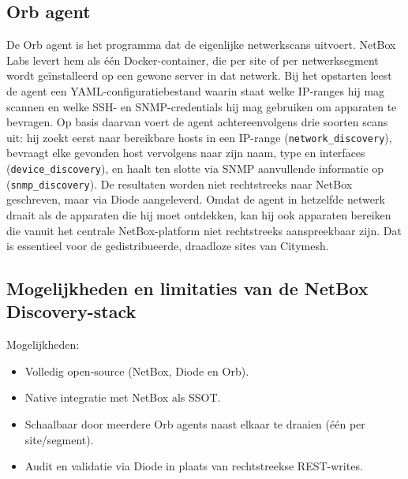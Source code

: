 \subsection{Orb agent}

De Orb agent is het programma dat de eigenlijke netwerkscans uitvoert\autocite{NetBoxLabsOrbAgent}. NetBox Labs levert hem als één Docker-container, die per site of per netwerksegment wordt geïnstalleerd op een gewone server in dat netwerk. Bij het opstarten leest de agent een YAML-configuratiebestand waarin staat welke IP-ranges hij mag scannen en welke SSH- en SNMP-credentials hij mag gebruiken om apparaten te bevragen. Op basis daarvan voert de agent achtereenvolgens drie soorten scans uit: hij zoekt eerst naar bereikbare hosts in een IP-range (\texttt{network\_discovery}), bevraagt elke gevonden host vervolgens naar zijn naam, type en interfaces (\texttt{device\_discovery}), en haalt ten slotte via SNMP aanvullende informatie op (\texttt{snmp\_discovery}). De resultaten worden niet rechtstreeks naar NetBox geschreven, maar via Diode aangeleverd. Omdat de agent in hetzelfde netwerk draait als de apparaten die hij moet ontdekken, kan hij ook apparaten bereiken die vanuit het centrale NetBox-platform niet rechtstreeks aanspreekbaar zijn. Dat is essentieel voor de gedistribueerde, draadloze sites van Citymesh.

\subsection{Mogelijkheden en limitaties van de NetBox Discovery-stack}

Mogelijkheden:
\begin{itemize}
  \item Volledig open-source (NetBox, Diode en Orb)\autocite{NetBoxOSS,DiodeDocs,NetBoxLabsOrbAgent}.
  \item Native integratie met NetBox als SSOT.
  \item Schaalbaar door meerdere Orb agents naast elkaar te draaien (\'e\'en per site/segment).
  \item Audit en validatie via Diode in plaats van rechtstreekse REST-writes.
\end{itemize}

